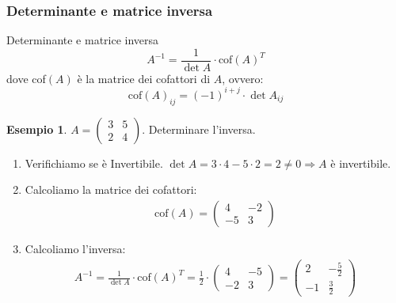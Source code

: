 \documentclass[a4paper]{article}
\theoremstyle{definition}
\newtheorem*{es}{Esempio}
\begin{document}
\subsubsection{Determinante e matrice inversa}

\begin{teo}{Determinante e matrice inversa}{}
	\begin{equation*}
		A^{-1} = \frac{1}{\det A} \cdot \text{cof}(A)^T
	\end{equation*}
	dove cof$(A)$ è la matrice dei cofattori di $A$, ovvero:
	\begin{equation*}
		\text{cof}(A)_{ij} = (-1)^{i + j} \cdot \det A_{ij}
	\end{equation*}
\end{teo}
\begin{es}
	$A = \begin{pmatrix}
			3 & 5 \\
			2 & 4
		\end{pmatrix}$. Determinare l'inversa.
	\begin{enumerate}
		\item Verifichiamo se è Invertibile. $\det A = 3 \cdot 4 - 5 \cdot 2 = 2 \ne 0 \Rightarrow A$ è invertibile.
		\item Calcoliamo la matrice dei cofattori:
		      \begin{align*}
			      \text{cof}(A) = \begin{pmatrix}
				                      4  & -2 \\
				                      -5 & 3
			                      \end{pmatrix}
		      \end{align*}
		\item Calcoliamo l'inversa:
		      \begin{align*}
			      A^{-1} = \frac{1}{\det A} \cdot \text{cof}(A)^T = \frac{1}{2} \cdot \begin{pmatrix}
				                                                                          4  & -5 \\
				                                                                          -2 & 3
			                                                                          \end{pmatrix} = \begin{pmatrix}
				                                                                                          2  & -\frac{5}{2} \\
				                                                                                          -1 & \frac{3}{2}

\end{pmatrix}
\end{align*}
\end{enumerate}
\end{es}
\end{document}
